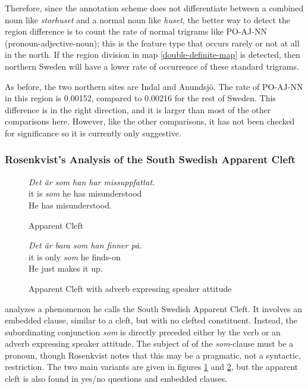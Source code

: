 Therefore, since the annotation scheme does not differentiate between
a combined noun like {\it storhuset} and a normal noun like {\it
  huset}, the better way to detect the region difference is to count
the rate of normal trigrams like PO-AJ-NN (pronoun-adjective-noun);
this is the feature type that occurs rarely or not at all in the
north. If the region division in map \ref{double-definite-map} is
detected, then northern Sweden will have a lower rate of occurrence of
these standard trigrams.

As before, the two northern sites are Indal and Anundsj\"o. The rate
of PO-AJ-NN in this region is 0.00152, compared to 0.00216 for the
rest of Sweden. This difference is in the right direction, and it is
larger than most of the other comparisons here. However, like the
other comparisons, it has not been checked for significance so it is
currently only suggestive.

\subsubsection{Rosenkvist's Analysis of the South Swedish Apparent Cleft}

\begin{figure}
  {\it Det \"ar som han har missuppfattat.} \\
  it is {\it som} he has misunderstood \\
  He has misunderstood.
  \caption{Apparent Cleft}
  \label{apparent-cleft-example1}
\end{figure}

\begin{figure}
  {\it Det \"ar bara som han finner p\.a.} \\
  it is only {\it som} he finds-on \\
  He just makes it up.
  \caption{Apparent Cleft with adverb expressing speaker attitude}
  \label{apparent-cleft-example2}
\end{figure}


 analyzes a phenomenon he calls the South
Swedish Apparent Cleft. It involves an embedded clause, similar to a
cleft, but with no clefted constituent. Instead, the subordinating
conjunction {\it som} is directly preceded either by the verb or an
adverb expressing speaker attitude. The subject of of the {\it
  som}-clause must be a pronoun, though Rosenkvist notes that this may
be a pragmatic, not a syntactic, restriction. The two main variants
are given in figures \ref{apparent-cleft-example1} and
\ref{apparent-cleft-example2}, but the apparent cleft is also found in
yes/no questions and embedded clauses.

